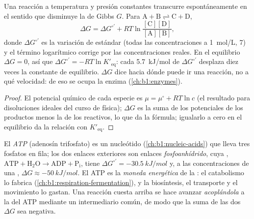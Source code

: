\begin{proposition}\label{prop:b1:water-small-molecules:gibbs}
Una reacción a temperatura y presión constantes transcurre espontáneamente
en el sentido que disminuye la  de Gibbs $G$. Para
$\mathrm{A} + \mathrm{B} \rightleftharpoons \mathrm{C} + \mathrm{D}$,
\[
\Delta G = \Delta G^{\circ\prime} + RT\ln\frac{[\mathrm{C}][\mathrm{D}]}{[\mathrm{A}][\mathrm{B}]},
\]
donde $\Delta G^{\circ\prime}$ es la variación de  estándar
(todas las concentraciones a \qty{1}{mol/L},  7) y el término logarítmico
corrige por las concentraciones reales. En el equilibrio $\Delta G = 0$,
así que $\Delta G^{\circ\prime} = -RT\ln K'_{\text{eq}}$: cada
\qty{5.7}{kJ/mol} de $\Delta G^{\circ\prime}$ desplaza diez veces la
constante de equilibrio. $\Delta G$ dice hacia dónde puede ir una reacción,
no a qué velocidad: de eso se ocupa la enzima (\cref{ch:b1:enzymes}).
\end{proposition}
\begin{proof}
El potencial químico de cada especie es $\mu = \mu^\circ + RT\ln c$ (el
resultado para disoluciones ideales del curso de física); $\Delta G$ es la
suma de los potenciales de los productos menos la de los reactivos, lo que
da la fórmula; igualarlo a cero en el equilibrio da la relación con
$K'_{\text{eq}}$.
\end{proof}

\begin{definition}\label{def:b1:water-small-molecules:atp}
El \emph{ATP} (adenosín trifosfato) es un nucleótido
(\cref{ch:b1:nucleic-acids}) que lleva tres fosfatos en fila; los dos
enlaces exteriores son enlaces
\emph{fosfoanhídrido}, cuya ,
$\mathrm{ATP} + \mathrm{H_2O} \to \mathrm{ADP} +
\mathrm{P_i}$, tiene
$\Delta G^{\circ\prime} = \qty{-30.5}{kJ/mol}$ y, a las concentraciones de
una , $\Delta G \approx \qty{-50}{kJ/mol}$. El ATP es la \emph{moneda
energética} de la : el catabolismo lo fabrica
(\cref{ch:b1:respiration-fermentation}), y la biosíntesis, el transporte y
el movimiento lo gastan. Una reacción cuesta arriba se hace avanzar
\emph{acoplándola} a la  del ATP
mediante un intermediario común, de modo que la suma de las dos $\Delta G$
sea negativa.
\end{definition}

